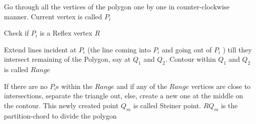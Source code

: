 \begin{list}{}{}

\item 
Go through all the vertices of the polygon one by one in counter-clockwise manner. Current vertex is called $P_i$ %


\item 
Check if $P_i$ is a Reflex vertex $R$  %




\item 
Extend lines incident at $P_i$ (the line coming into $P_i$ and going out of $P_i$ ) till they intersect remaining of the Polygon, say at $Q_1$ and $Q_2$. Contour within $Q_1$ and $Q_2$ is called $Range$ %


\item 
If there are no $P_i$s within the $Range$ and if any of the $Range$ vertices are close to intersections, separate the triangle out, else, create a new one at the middle on the contour. This newly created point  $Q_m$ is called Steiner point.  $RQ_m$ is the partition-chord to divide the polygon %


\end{list}

